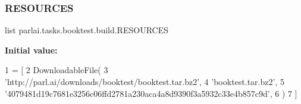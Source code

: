 \subsubsection{\texorpdfstring{R\+E\+S\+O\+U\+R\+C\+ES}{RESOURCES}}
{\footnotesize\ttfamily list parlai.\+tasks.\+booktest.\+build.\+R\+E\+S\+O\+U\+R\+C\+ES}

{\bfseries Initial value\+:}
\begin{DoxyCode}
1 =  [
2     DownloadableFile(
3         \textcolor{stringliteral}{'http://parl.ai/downloads/booktest/booktest.tar.bz2'},
4         \textcolor{stringliteral}{'booktest.tar.bz2'},
5         \textcolor{stringliteral}{'4079481d19c7681e3256c06ffd2781a230aca4a8d9390f3a5932c33e4b857c9d'},
6     )
7 ]
\end{DoxyCode}
